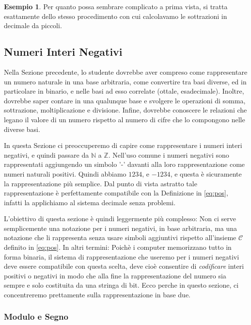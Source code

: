 \documentclass[a4paper]{book}
\theoremstyle{definition}
\newtheorem{ex}{Esempio}
\begin{document}
\begin{ex}
Per quanto possa sembrare complicato a prima vista, si tratta esattamente
dello stesso procedimento con cui calcolavamo le sottrazioni in decimale da piccoli.
\end{ex}

\subsection{Numeri Interi Negativi}

Nella Sezione precedente, lo studente dovrebbe aver compreso come rappresentare
un numero naturale in una base arbitraria, come convertire tra basi diverse, ed
in particolare in binario, e nelle basi ad esso correlate (ottale,
esadecimale). Inoltre, dovrebbe saper contare in una qualunque base e svolgere
le operazioni di somma, sottrazione, moltiplicazione e divisione. Infine,
dovrebbe conoscere le relazioni che legano il valore di un numero rispetto al
numero di cifre che lo compongono nelle diverse basi.

In questa Sezione ci preoccuperemo di capire come rappresentare i numeri interi negativi, e quindi passare da $\mathbb{N}$ a $\mathbb{Z}$. Nell'uso comune i numeri negativi sono rappresentati aggiungendo un simbolo '-' davanti alla loro rappresentazione come numeri naturali positivi. Quindi abbiamo $1234$, e $-1234$, e questa è sicuramente la rappresentazione più semplice. Dal punto di vista astratto tale rappresentazione è perfettamente compatibile con la Definizione in \eqref{eq:pos}, infatti la applichiamo al sistema decimale senza problemi.

L'obiettivo di questa sezione è quindi leggermente più complesso: Non ci serve semplicemente una notazione per i numeri negativi, in base arbitraria, ma una notazione che li rappresenta senza usare simboli aggiuntivi rispetto all'insieme $\mathcal{C}$ definito in \eqref{eq:pos}. In altri termini: Poichè i computer memorizzano tutto in forma binaria, il sistema di rappresentazione che useremo per i numeri negativi deve essere compatibile con questa scelta, deve cioè consentire di \emph{codificare} interi positivi o negativi in modo che alla fine la rappresentazione del numero sia sempre e solo costituita da una stringa di bit. Ecco perche in questo sezione, ci concentreremo prettamente sulla rappresentazione in base due.

\subsubsection{Modulo e Segno}
\end{document}
